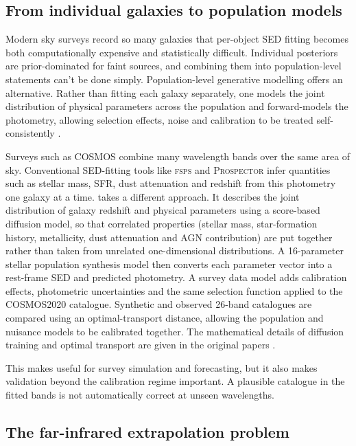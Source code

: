 \documentclass[12pt,a4paper]{article}
\begin{document}
\subsection{From individual galaxies to population models}
\label{sec:intro:population}

Modern sky surveys record so many galaxies that per-object SED fitting becomes both
computationally expensive and statistically difficult. Individual posteriors are
prior-dominated for faint sources, and combining them into population-level statements
can't be done simply. Population-level generative modelling offers an alternative. Rather than
fitting each galaxy separately, one models the joint distribution of physical parameters
across the population and forward-models the photometry, allowing selection effects,
noise and calibration to be treated self-consistently \citep{Alsing_2024}.

Surveys such as COSMOS \citep{Scoville_2007} combine many wavelength bands over the
same area of sky. Conventional SED-fitting tools like \textsc{fsps}
\citep{Conroy_2009} and \textsc{Prospector} \citep{Leja_2017} infer quantities such as
stellar mass, SFR, dust attenuation and redshift from this photometry one galaxy at a
time. \popcosmos{} \citep{Alsing_2024,Thorp_2024} takes a different approach. It
describes the joint distribution of galaxy redshift and physical parameters using a
score-based diffusion model, so that correlated properties (stellar mass,
star-formation history, metallicity, dust attenuation and AGN contribution) are put
together rather than taken from unrelated one-dimensional distributions. A 16-parameter
stellar population synthesis model then converts each parameter vector into a
rest-frame SED and predicted photometry. A survey data model adds calibration effects,
photometric uncertainties and the same selection function applied to the COSMOS2020
catalogue. Synthetic and observed 26-band catalogues are compared using an
optimal-transport distance, allowing the population and nuisance models to be
calibrated together. The mathematical details of diffusion training and optimal
transport are given in the original papers \citep{Alsing_2024,Thorp_2024}.

This makes \popcosmos{} useful for survey simulation and
forecasting, but it also makes validation beyond the calibration regime important. A plausible
catalogue in the fitted bands is not automatically correct at unseen wavelengths.

\subsection{The far-infrared extrapolation problem}
\label{sec:intro:extrapolation}
\end{document}

